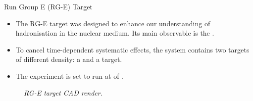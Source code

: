 \begin{frame}{Run Group E (RG-E) Target}
    \label{10.21::rge_target}

    \begin{itemize}
        \item
            The RG-E target was designed to enhance our understanding of hadronisation in the nuclear medium.
            Its main observable is the .

        \item
            To cancel time-dependent systematic effects, the system contains two targets of different density: a  and a  target.

        \item
            The experiment is set to run at  of .
    \end{itemize}

    \begin{center}
        \begin{figure}[t]

            \scriptsize{\textit{
                RG-E target CAD render.
            }}
        \end{figure}
    \end{center}
\end{frame}
